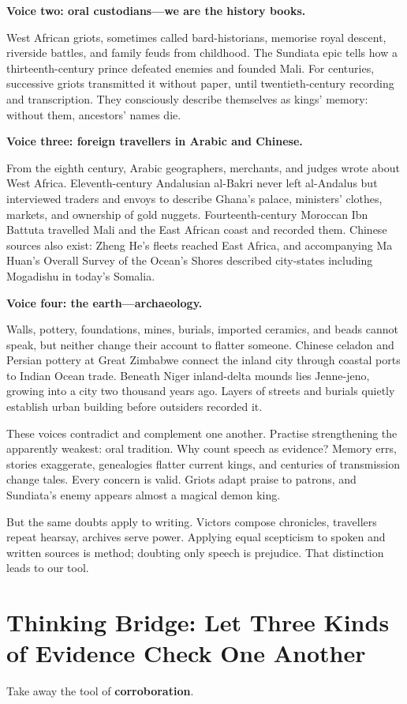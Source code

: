 \textbf{Voice two: oral custodians---we are the history books.}

West African griots, sometimes called bard-historians, memorise royal descent, riverside battles, and family feuds from childhood. The Sundiata epic tells how a thirteenth-century prince defeated enemies and founded Mali. For centuries, successive griots transmitted it without paper, until twentieth-century recording and transcription. They consciously describe themselves as kings' memory: without them, ancestors' names die.

\textbf{Voice three: foreign travellers in Arabic and Chinese.}

From the eighth century, Arabic geographers, merchants, and judges wrote about West Africa. Eleventh-century Andalusian al-Bakri never left al-Andalus but interviewed traders and envoys to describe Ghana's palace, ministers' clothes, markets, and ownership of gold nuggets. Fourteenth-century Moroccan Ibn Battuta travelled Mali and the East African coast and recorded them. Chinese sources also exist: Zheng He's fleets reached East Africa, and accompanying Ma Huan's Overall Survey of the Ocean's Shores described city-states including Mogadishu in today's Somalia.

\textbf{Voice four: the earth---archaeology.}

Walls, pottery, foundations, mines, burials, imported ceramics, and beads cannot speak, but neither change their account to flatter someone. Chinese celadon and Persian pottery at Great Zimbabwe connect the inland city through coastal ports to Indian Ocean trade. Beneath Niger inland-delta mounds lies Jenne-jeno, growing into a city two thousand years ago. Layers of streets and burials quietly establish urban building before outsiders recorded it.

These voices contradict and complement one another. Practise strengthening the apparently weakest: oral tradition. Why count speech as evidence? Memory errs, stories exaggerate, genealogies flatter current kings, and centuries of transmission change tales. Every concern is valid. Griots adapt praise to patrons, and Sundiata's enemy appears almost a magical demon king.

But the same doubts apply to writing. Victors compose chronicles, travellers repeat hearsay, archives serve power. Applying equal scepticism to spoken and written sources is method; doubting only speech is prejudice. That distinction leads to our tool.

\section[Thinking Bridge: Cross-Check Evidence]{Thinking Bridge: Let Three Kinds of Evidence Check One Another}
Take away the tool of \textbf{corroboration}.

